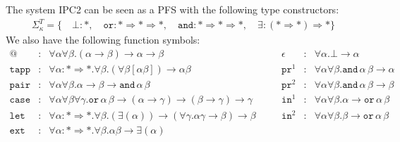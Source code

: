 \documentclass[a4paper,UKenglish,cleveref,autoref,numberwithinsect]{lipics-v2019}
\theoremstyle{definition}
\newcommand{\arrkind}{\Rightarrow}
\newcommand{\arrtype}{\rightarrow}
\newcommand{\proj}{\mathtt{pr}}
\begin{document}
The system IPC2 can be seen as a PFS with the following type constructors:
\[
\begin{array}{c}
\Sigma^T_\kappa = \{\quad
  \bot : *,\quad
  \mathtt{or} : * \arrkind * \arrkind *,\quad
  \mathtt{and} : * \arrkind * \arrkind *,\quad
  \exists : (* \arrkind *) \arrkind *
  \}
\end{array}
\]
We also have the following function symbols:
\[
\begin{array}{rclcrcl}
@ & : & \forall \alpha \forall \beta . (\alpha \arrtype \beta) \arrtype \alpha \arrtype \beta &
\quad &
\epsilon & : & \forall \alpha . \bot \arrtype \alpha \\

\mathtt{tapp} & : & \forall \alpha : * \arrkind * . \forall \beta .
  (\forall \beta [\alpha \beta]) \arrtype \alpha \beta &
\quad &
\proj^1 & : & \forall \alpha \forall \beta . \mathtt{and}\, \alpha\, \beta \arrtype \alpha \\

\mathtt{pair} & : & \forall \alpha \forall \beta . \alpha \arrtype \beta \arrtype
  \mathtt{and}\, \alpha\, \beta &
\quad &
\proj^2 & : & \forall \alpha \forall \beta . \mathtt{and}\, \alpha\, \beta \arrtype \beta \\

\mathtt{case} & : & \forall \alpha \forall \beta \forall \gamma . \mathtt{or}\, \alpha\, \beta \arrtype
  (\alpha \arrtype \gamma) \arrtype (\beta \arrtype \gamma) \arrtype \gamma &
\quad &
\mathtt{in}^1 & : & \forall \alpha \forall \beta . \alpha \arrtype
  \mathtt{or}\, \alpha\, \beta \\

\mathtt{let} & : & \forall \alpha : * \arrkind * . \forall \beta .
  (\exists (\alpha)) \arrtype
  (\forall \gamma . \alpha \gamma \arrtype \beta) \arrtype \beta &
\quad &
\mathtt{in}^2 & : & \forall \alpha \forall \beta . \beta \arrtype
  \mathtt{or}\, \alpha\, \beta \\

\mathtt{ext} & : & \forall \alpha : * \arrkind * . \forall \beta . \alpha \beta \arrtype
  \exists (\alpha)
\end{array}
\]
\end{document}
